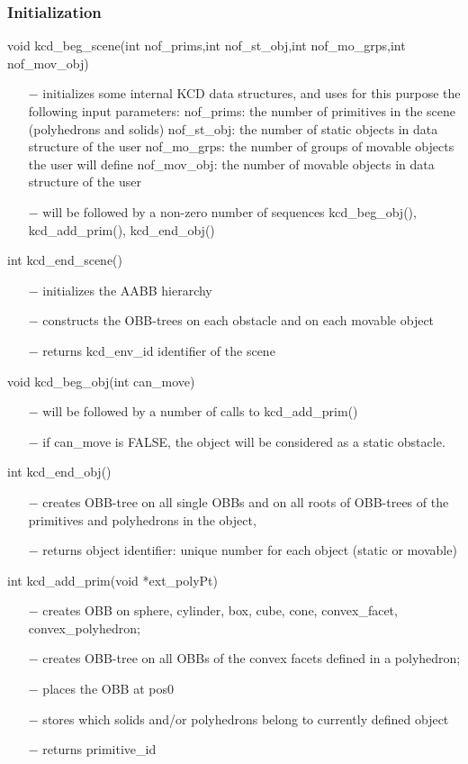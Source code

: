\subsubsection{Initialization}


void kcd\_beg\_scene(int nof\_prims,int nof\_st\_obj,int nof\_mo\_grps,int nof\_mov\_obj)
\begin{itemize}
\item[$-$] initializes some internal KCD data structures, and uses for this purpose
  the following input parameters:
  nof\_prims: the number of primitives in the scene (polyhedrons and solids)
  nof\_st\_obj: the number of static objects in data structure of the user
  nof\_mo\_grps: the number of groups of movable objects the user will define
  nof\_mov\_obj: the number of movable objects in data structure of the user
\item[$-$] will be followed by a non-zero number of sequences kcd\_beg\_obj(),
  kcd\_add\_prim(), kcd\_end\_obj()
\end{itemize}
int kcd\_end\_scene()
\begin{itemize}
\item[$-$] initializes the AABB hierarchy
\item[$-$] constructs the OBB-trees on each obstacle and on each movable object
\item[$-$] returns kcd\_env\_id identifier of the scene
\end{itemize}
void kcd\_beg\_obj(int can\_move)
\begin{itemize}
\item[$-$] will be followed by a number of calls to kcd\_add\_prim()
\item[$-$] if can\_move is FALSE, the object will be considered
   as a static obstacle.
\end{itemize}
int kcd\_end\_obj()
\begin{itemize}
\item[$-$] creates OBB-tree on all single OBBs and on all roots 
   of OBB-trees of the primitives and polyhedrons in the object, 
\item[$-$] returns object identifier: unique number for each object (static or movable)
\end{itemize}
int kcd\_add\_prim(void *ext\_polyPt)    
\begin{itemize}
\item[$-$] creates OBB on sphere, cylinder, box, cube, cone, \newline
   convex\_facet, convex\_polyhedron;
\item[$-$] creates OBB-tree on all OBBs of the convex facets defined
   in a polyhedron;
\item[$-$] places the OBB at pos0
\item[$-$] stores which solids and/or polyhedrons belong to currently defined object
\item[$-$] returns primitive\_id
\end{itemize}
